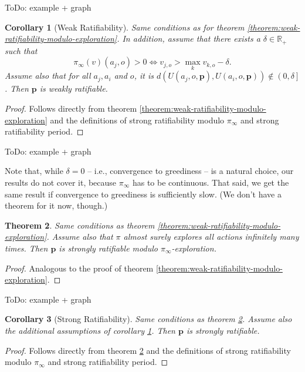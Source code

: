 \documentclass{article}
\newtheorem{thm}{Theorem} %
\newtheorem{corollary}[thm]{Corollary}
\begin{document}
ToDo: example + graph



\begin{corollary}[Weak Ratifiability]\label{corollary:weak-ratifiability}
Same conditions as for theorem \ref{theorem:weak-ratifiability-modulo-exploration}. In addition, assume that there exists a $\delta\in \mathbb{R}_+$ such that 
\begin{equation}
\pi_\infty(v)(a_j,o) >0 \iff v_{j,o} > \max_k v_{k, o} - \delta.
\end{equation}
Assume also that for all $a_j,a_i$ and $o$, it is $d(U(a_j,o,\mathbf{p}),U(a_i,o,\mathbf{p}))\notin \left(0,\delta \right]$. Then $\mathbf{p}$ is weakly ratifiable.
\end{corollary}

\begin{proof}
Follows directly from theorem \ref{theorem:weak-ratifiability-modulo-exploration} and the definitions of strong ratifiability modulo $\pi_\infty$ and strong ratifiability period.
\end{proof}

ToDo: example + graph

Note that, while $\delta=0$ -- i.e., convergence to greediness -- is a natural choice, our results do not cover it, because $\pi_\infty$ has to be continuous. That said, we get the same result if convergence to greediness is sufficiently slow. (We don't have a theorem for it now, though.)

\begin{thm}\label{theorem:strong-ratifiability-modulo-exploration}
Same conditions as theorem \ref{theorem:weak-ratifiability-modulo-exploration}. Assume also that $\pi$ almost surely explores all actions infinitely many times. Then $\mathbf{p}$ is strongly ratifiable modulo $\pi_\infty$-exploration. 
\end{thm}
\begin{proof}
Analogous to the proof of theorem \ref{theorem:weak-ratifiability-modulo-exploration}.
\end{proof}

ToDo: example + graph

\begin{corollary}[Strong Ratifiability]
Same conditions as theorem \ref{theorem:strong-ratifiability-modulo-exploration}. Assume also the additional assumptions of corollary \ref{corollary:weak-ratifiability}. Then $\mathbf{p}$ is strongly ratifiable.
\end{corollary}
\begin{proof}
Follows directly from theorem \ref{theorem:strong-ratifiability-modulo-exploration} and the definitions of strong ratifiability modulo $\pi_\infty$ and strong ratifiability period.
\end{proof}
\end{document}
